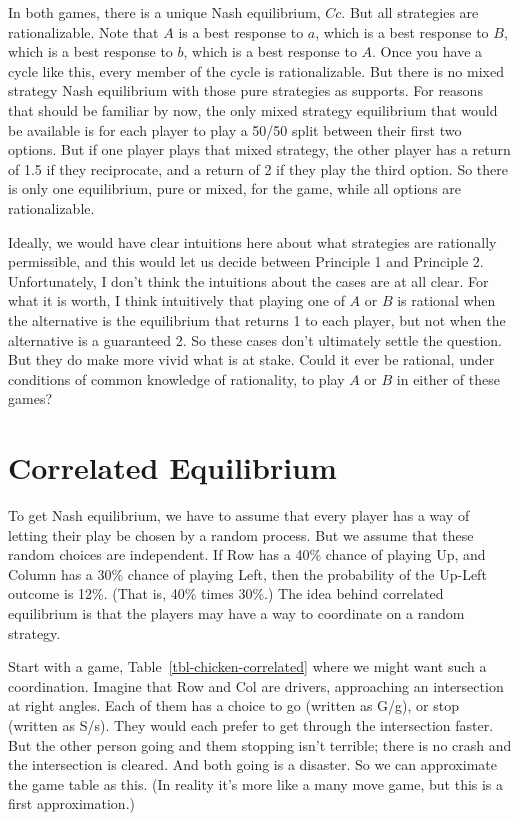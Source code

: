 \documentclass[
  11pt,
  letterpaper,
]{scrbook}
\begin{document}
In both games, there is a unique Nash equilibrium, \(Cc\). But all
strategies are rationalizable. Note that \(A\) is a best response to
\(a\), which is a best response to \(B\), which is a best response to
\(b\), which is a best response to \(A\). Once you have a cycle like
this, every member of the cycle is rationalizable. But there is no mixed
strategy Nash equilibrium with those pure strategies as supports. For
reasons that should be familiar by now, the only mixed strategy
equilibrium that would be available is for each player to play a 50/50
split between their first two options. But if one player plays that
mixed strategy, the other player has a return of 1.5 if they
reciprocate, and a return of 2 if they play the third option. So there
is only one equilibrium, pure or mixed, for the game, while all options
are rationalizable.

Ideally, we would have clear intuitions here about what strategies are
rationally permissible, and this would let us decide between Principle 1
and Principle 2. Unfortunately, I don't think the intuitions about the
cases are at all clear. For what it is worth, I think intuitively that
playing one of \(A\) or \(B\) is rational when the alternative is the
equilibrium that returns 1 to each player, but not when the alternative
is a guaranteed 2. So these cases don't ultimately settle the question.
But they do make more vivid what is at stake. Could it ever be rational,
under conditions of common knowledge of rationality, to play \(A\) or
\(B\) in either of these games?

\section{Correlated Equilibrium}\label{sec-correlated-equilibrium}

To get Nash equilibrium, we have to assume that every player has a way
of letting their play be chosen by a random process. But we assume that
these random choices are independent. If Row has a 40\% chance of
playing Up, and Column has a 30\% chance of playing Left, then the
probability of the Up-Left outcome is 12\%. (That is, 40\% times 30\%.)
The idea behind correlated equilibrium is that the players may have a
way to coordinate on a random strategy.

Start with a game, Table~\ref{tbl-chicken-correlated} where we might
want such a coordination. Imagine that Row and Col are drivers,
approaching an intersection at right angles. Each of them has a choice
to go (written as G/g), or stop (written as S/s). They would each prefer
to get through the intersection faster. But the other person going and
them stopping isn't terrible; there is no crash and the intersection is
cleared. And both going is a disaster. So we can approximate the game
table as this. (In reality it's more like a many move game, but this is
a first approximation.)
\end{document}
